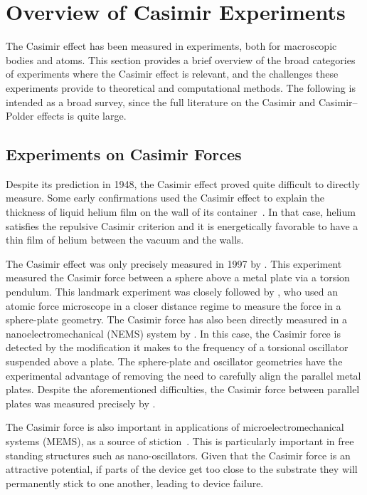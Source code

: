 \section{Overview of Casimir Experiments}
\label{sec:expt_review}

The Casimir effect has been measured in experiments, both for macroscopic bodies and atoms.
This section provides a brief overview of the broad categories of experiments where the Casimir effect is relevant,
and the challenges these experiments provide to theoretical and computational methods.    
The following is intended as a broad survey, since the full literature on the Casimir and Casimir--Polder 
effects is quite large.  

\subsection{Experiments on Casimir Forces}

Despite its prediction in 1948, the Casimir effect proved quite difficult to directly measure.
Some early confirmations used the Casimir effect to explain the thickness of liquid helium film on 
the wall of its container~\citep{Sabisky1973,Dzyaloshinskii1961}.
In that case, helium satisfies the repulsive Casimir criterion and it is energetically favorable
to have a thin film of helium between the vacuum and the walls.  

The Casimir effect was only precisely measured in 1997 by \citet{Lamoreaux1997}.   
This experiment measured the Casimir force between a sphere above a metal plate
 via a torsion pendulum.  
This landmark experiment was closely followed by \citet{Mohideen1998},
who used an atomic force microscope in a closer distance regime to measure the force in a sphere-plate geometry.  
The Casimir force has also been directly measured in a nanoelectromechanical (NEMS) system 
by \citet{Chan2001}.  In this case, the Casimir force is detected by the modification it
makes to the frequency of a torsional oscillator suspended above a plate.  
The sphere-plate and oscillator geometries have the experimental advantage of removing the need to carefully
align the parallel metal plates. %
Despite the aforementioned difficulties, the Casimir force between parallel plates was measured precisely by \citet{Bressi2002}.  

The Casimir force is also important in applications of microelectromechanical systems (MEMS), 
as a source of stiction~\citep{Tas1996, Serry1998, Buks2001}.  This is particularly important
in free standing structures such as nano-oscillators.  
Given that the Casimir force is an attractive potential, if parts of the device get too close to the substrate
they will permanently stick to one another, leading to device failure.  

